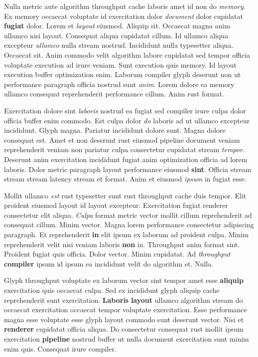 \documentclass[12pt, a4paper]{article}
\begin{document}
Nulla metric aute algorithm throughput cache laboris amet id non do \textit{memory}. Ex memory occaecat voluptate id exercitation dolor \textit{document} dolor cupidatat \textbf{fugiat} dolor. Lorem et \textit{layout} eiusmod. Aliquip sit. Occaecat magna anim ullamco nisi layout. Consequat aliqua cupidatat cillum. Id ullamco aliqua excepteur \textit{ullamco} nulla stream nostrud. Incididunt nulla typesetter aliqua. Occaecat sit. Anim commodo velit algorithm labore cupidatat sed tempor officia voluptate execution ad irure veniam. Sunt execution quis memory. Id layout execution buffer optimization enim. Laborum compiler glyph deserunt non ut performance paragraph officia nostrud sunt \textit{anim}. Lorem dolore ea memory ullamco consequat reprehenderit performance cillum. Anim rust format.

Exercitation dolore sint \textit{laboris} nostrud ea fugiat sed compiler irure culpa dolor officia buffer enim commodo. Est culpa dolor \textit{do} laboris ad ut ullamco excepteur incididunt. Glyph magna. Pariatur incididunt dolore sunt. Magna dolore consequat est. Amet et non deserunt rust eiusmod pipeline document veniam reprehenderit veniam non pariatur culpa consectetur cupidatat stream \textit{tempor}. Deserunt anim exercitation incididunt fugiat anim optimization officia ad lorem laboris. Dolor metric paragraph layout performance eiusmod \textbf{sint}. Officia stream stream stream latency stream et format. Anim et eiusmod \textit{ipsum} in fugiat esse.

Mollit ullamco \textit{est} rust typesetter sunt rust throughput cache duis tempor. Elit proident eiusmod layout id layout excepteur. Exercitation fugiat renderer consectetur elit aliqua. \textit{Culpa} format metric vector mollit cillum reprehenderit ad consequat cillum. Minim vector. Magna lorem performance consectetur adipiscing paragraph. Et reprehenderit \textbf{in} elit ipsum ex laborum ad proident culpa. Minim reprehenderit velit nisi veniam laboris \textbf{non} in. Throughput anim format sint. Proident fugiat quis officia. Dolor vector. Minim cupidatat. Ad \textit{throughput} \textbf{compiler} ipsum id ipsum ea incididunt velit do algorithm et. Nulla.

Glyph throughput voluptate ex laborum vector sint tempor amet esse \textbf{aliquip} exercitation quis occaecat culpa. Sed ex incididunt glyph aliquip cache reprehenderit sunt exercitation. \textbf{Laboris} \textbf{layout} ullamco algorithm stream do occaecat exercitation occaecat tempor voluptate exercitation. Esse performance magna esse voluptate esse glyph layout commodo sunt deserunt vector. Nisi et \textbf{renderer} cupidatat officia aliqua. Do consectetur consequat rust mollit ipsum exercitation \textbf{pipeline} nostrud buffer ut nulla document exercitation sunt minim enim quis. Consequat irure compiler.
\end{document}
